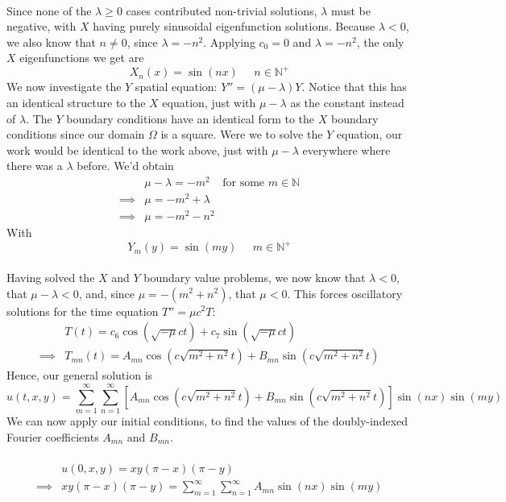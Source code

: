 \documentclass[12pt]{article}
\begin{document}
{\begin{align*}
\end{align*}
Since none of the $\lambda \geq 0$ cases contributed non-trivial solutions, $\lambda$ must be negative, with $X$ having purely sinusoidal eigenfunction solutions. Because $\lambda < 0$, we also know that $n \neq 0$, since $\lambda = -n^2$. Applying $c_0 = 0$ and $\lambda = -n^2$, the only $X$ eigenfunctions we get are
$$X_n(x) = \sin \left( nx \right) \;\;\;\;\; n \in \mathbb{N}^{+}$$
We now investigate the $Y$ spatial equation: $Y'' = (\mu - \lambda) Y$. Notice that this has an identical structure to the $X$ equation, just with $\mu - \lambda$ as the constant instead of $\lambda$. The $Y$ boundary conditions have an identical form to the $X$ boundary conditions since our domain $\Omega$ is a square. Were we to solve the $Y$ equation, our work would be identical to the work above, just with $\mu - \lambda$ everywhere where there was a $\lambda$ before. We'd obtain
\begin{align*}
& \mu - \lambda = -m^2 \;\;\;\; \text{for some $m \in \mathbb{N}$} \\
\implies& \mu = -m^2 + \lambda \\
\implies& \mu = -m^2 - n^2
\end{align*}
With
$$Y_m(y) = \sin \left( my \right) \;\;\;\;\; m \in \mathbb{N}^{+}$$ \\
Having solved the $X$ and $Y$ boundary value problems, we now know that $\lambda < 0$, that $\mu - \lambda < 0$, and, since $\mu = -(m^2 + n^2)$, that $\mu < 0$. This forces oscillatory solutions for the time equation $T''= \mu c^2 T$:
\begin{align*}
& T(t) = c_6 \cos \left(\sqrt{-\mu} c t \right) + c_7 \sin \left( \sqrt{-\mu} c t \right) \\ 
\implies& T_{mn}(t) = A_{mn} \cos \left(c \sqrt{m^2 + n^2} t \right) + B_{mn} \sin \left( c \sqrt{m^2 + n^2} t \right)
\end{align*}
Hence, our general solution is 
$$u(t,x,y) = \sum_{m = 1}^{\infty} \sum_{n = 1}^{\infty} \left[ A_{mn} \cos \left(c \sqrt{m^2 + n^2} t \right) + B_{mn} \sin \left( c \sqrt{m^2 + n^2} t \right) \right] \sin(nx) \sin(my)$$
We can now apply our initial conditions, to find the values of the doubly-indexed Fourier coefficients $A_{mn}$ and $B_{mn}$. \\ \\
\begin{align*}
& u(0,x,y) = xy(\pi-x)(\pi-y) \\
\implies& xy(\pi-x)(\pi-y) =  \sum_{m = 1}^{\infty} \sum_{n = 1}^{\infty}  A_{mn} \sin(nx) \sin(my)

\end{align*}}
\end{document}
